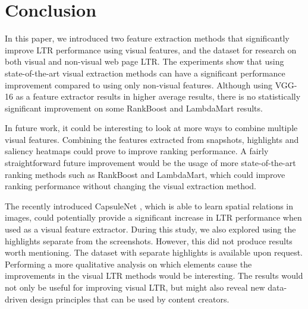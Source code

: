 
\section{Conclusion}
In this paper, we introduced two feature extraction methods that significantly improve \ac{LTR} performance using visual features, and the \datasetname{} dataset for research on both visual and non-visual web page \ac{LTR}.
The experiments show that using state-of-the-art visual extraction methods can have a significant performance improvement compared to using only non-visual features. Although using VGG-16 as a feature extractor results in higher average results, there is no statistically significant improvement on some RankBoost and LambdaMart results. %

In future work, it could be interesting to look at more ways to combine multiple visual features. Combining the features extracted from snapshots, highlights and saliency heatmaps could prove to improve ranking performance. 
A fairly straightforward future improvement would be the usage of more state-of-the-art ranking methods such as RankBoost and LambdaMart, which could improve ranking performance without changing the visual extraction method.

The recently introduced CapsuleNet \cite{sabour2017dynamic}, which is able to learn spatial relations in images, could potentially provide a significant increase in \ac{LTR} performance when used as a visual feature extractor.  
During this study, we also explored using the highlights separate from the screenshots. 
However, this did not produce results worth mentioning. 
The dataset with separate highlights is available upon request. 
Performing a more qualitative analysis on which elements cause the improvements in the visual \ac{LTR} methods would be interesting. 
The results would not only be useful for improving visual \ac{LTR}, but might also reveal new data-driven design principles that can be used by content creators. 